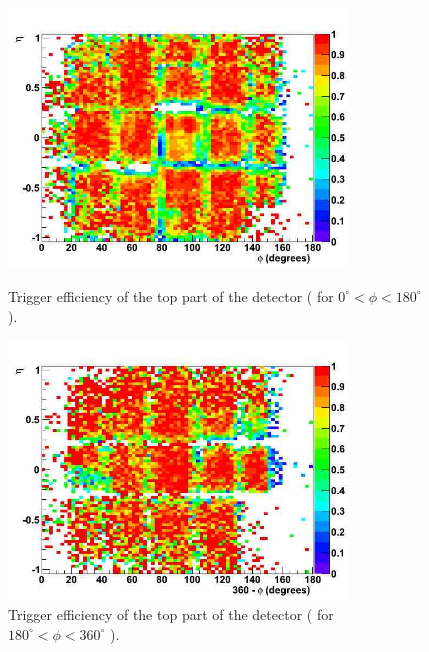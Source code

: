 \begin{figure}[hbtp]
\begin{minipage}{1.0\textwidth}
  \begin{center}
 
     \includegraphics[width=0.8\textwidth]{eff_eta_phi_top_08}
       \caption{ Trigger efficiency of the top part of the detector (
 for $ 0^\circ < \phi < 180^\circ $ ). 
}
    \label{fig:eff_eta_phi_top_08}
  \end{center}
  \end{minipage}

     \begin{minipage}{1.0\textwidth}
     \begin{center}
      \includegraphics[width=0.8\textwidth]{eff_eta_phi_bot_08}
       \caption{ Trigger efficiency of the top part of the detector (
 for $ 180^\circ < \phi < 360^\circ $ ). %
}
    \label{fig:eff_eta_phi_bot_08}


  \end{center}
  \end{minipage}
     


\end{figure}


